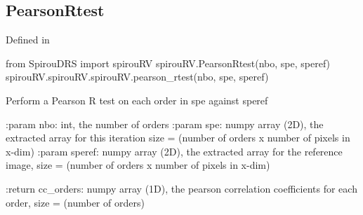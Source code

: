 \begin{minipage}{\textwidth}
\subsection{PearsonRtest}

Defined in \spirouRV{}

\begin{pythonbox}
from SpirouDRS import spirouRV
spirouRV.PearsonRtest(nbo, spe, speref)
spirouRV.spirouRV.spirouRV.pearson_rtest(nbo, spe, speref)
\end{pythonbox}

\begin{pythondocstring}
Perform a Pearson R test on each order in spe against speref

:param nbo: int, the number of orders
:param spe: numpy array (2D), the extracted array for this iteration
            size = (number of orders x number of pixels in x-dim)
:param speref: numpy array (2D), the extracted array for the reference
               image, size = (number of orders x number of pixels in x-dim)

:return cc_orders: numpy array (1D), the pearson correlation coefficients
                   for each order, size = (number of orders)
\end{pythondocstring}
\end{minipage}


